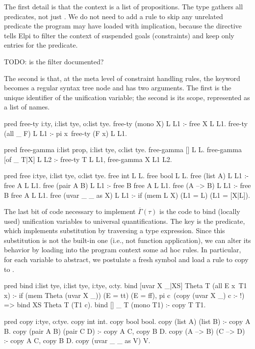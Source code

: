\documentclass[a4paper, 11pt]{book}
\begin{document}
The first detail is that the context is a list of propositions. The
 type gathers all predicates, not just . We do not need
to add a rule to skip any unrelated predicate the program may have loaded with
implication, because the  directive tells Elpi to filter the context of suspended goals
(constraints) and keep only entries for the  predicate.

TODO: is the filter documented?

The second is that, at the meta level of constraint handling rules, the
 keyword becomes a regular syntax tree node and has two arguments.
The first is the unique identifier of the unification variable; the second is
its scope, represented as a list of names.

\begin{elpicode}
pred free-ty i:ty, i:list tye, o:list tye.
free-ty (mono X) L L1 :- free X L L1.
free-ty (all _ F) L L1 :- pi x\ free-ty (F x) L L1.

pred free-gamma i:list prop, i:list tye, o:list tye.
free-gamma [] L L.
free-gamma [of _ T|X] L L2 :- free-ty T L L1, free-gamma X L1 L2.

pred free i:tye, i:list tye, o:list tye.
free int L L.
free bool L L.
free (list A) L L1 :- free A L L1.
free (pair A B) L L1 :- free B {free A L} L1.
free (A --> B) L L1 :- free B {free A L} L1.
free (uvar _ _ as X) L L1 :- if (mem L X) (L1 = L) (L1 = [X|L]).
\end{elpicode}

The last bit of code necessary to implement $\overline{\Gamma}(\tau)$ is the
code to bind (locally used) unification variables to universal
quantifications. The key is the  predicate, which implements
substitution by traversing a type expression. Since this substitution is not
the built-in one (i.e., not function application), we can alter its behavior
by loading into the program context some ad hoc rules. In particular, for
each variable  to abstract, we postulate a fresh symbol
 and load a rule to copy  to .

\begin{elpicode}
pred bind i:list tye, i:list tye, i:tye, o:ty.
bind [uvar X _|XS] Theta T (all E x\ T1 x) :- %
  if (mem Theta (uvar X _)) (E = tt) (E = ff),
  pi c\ (copy (uvar X _) c :- !) => bind XS Theta T (T1 c).
bind [] _ T (mono T1) :- copy T T1. %

pred copy i:tye, o:tye.
copy int int.
copy bool bool.
copy (list A) (list B) :- copy A B.
copy (pair A B) (pair C D) :- copy A C, copy B D.
copy (A --> B) (C --> D) :- copy A C, copy B D.
copy (uvar _ _ as V) V.
\end{elpicode}
\end{document}
